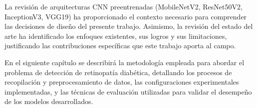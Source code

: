 La revisión de arquitecturas CNN preentrenadas (MobileNetV2, ResNet50V2, InceptionV3, VGG19) ha proporcionado el contexto necesario para comprender las decisiones de diseño del presente trabajo. Asimismo, la revisión del estado del arte ha identificado los enfoques existentes, sus logros y sus limitaciones, justificando las contribuciones específicas que este trabajo aporta al campo.

En el siguiente capítulo se describirá la metodología empleada para abordar el problema de detección de retinopatía diabética, detallando los procesos de recopilación y preprocesamiento de datos, las configuraciones experimentales implementadas, y las técnicas de evaluación utilizadas para validar el desempeño de los modelos desarrollados.
